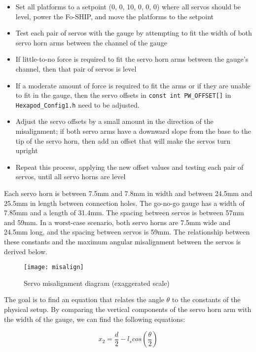 \documentclass[12pt,a4paper]{report}
\begin{document}
\begin{itemize}[noitemsep,topsep=0pt]
	\item Set all platforms to a setpoint (0, 0, 10, 0, 0, 0) where all servos should be level, power the Fo-SHIP, and move the platforms to the setpoint
	\item Test each pair of servos with the gauge by attempting to fit the width of both servo horn arms between the channel of the gauge
	\item If little-to-no force is required to fit the servo horn arms between the gauge’s channel, then that pair of servos is level
	\item If a moderate amount of force is required to fit the arms or if they are unable to fit in the gauge, then the servo offsets in \verb|const int PW_OFFSET[]| in \verb|Hexapod_Config1.h| need to be adjusted.
	\item Adjust the servo offsets by a small amount in the direction of the misalignment; if both servo arms have a downward slope from the base to the tip of the servo horn, then add an offset that will make the servos turn upright
	\item Repeat this process, applying the new offset values and testing each pair of servos, until all servo horns are level
\end{itemize}

Each servo horn is between 7.5mm and 7.8mm in width and between 24.5mm and 25.5mm in length between connection holes. The go-no-go gauge has a width of 7.85mm and a length of 31.4mm. The spacing between servos is between 57mm and 59mm. In a worst-case scenario, both servo horns are 7.5mm wide and 24.5mm long, and the spacing between servos is 59mm. The relationship between these constants and the maximum angular misalignment between the servos is derived below.

\begin{figure}[htbp]
	\centering
	\texttt{[image: misalign]}
	\caption{Servo misalignment diagram (exaggerated scale)}
	\label{fig:misalign}
\end{figure}

The goal is to find an equation that relates the angle $\theta$ to the constants of the physical setup. By comparing the vertical components of the servo horn arm with the width of the gauge, we can find the following equations:

\begin{equation}\label{eq:2eq14}
	x_2 = \frac{d}{2} - l_s cos(\frac{\theta}{2})
\end{equation}
\end{document}
